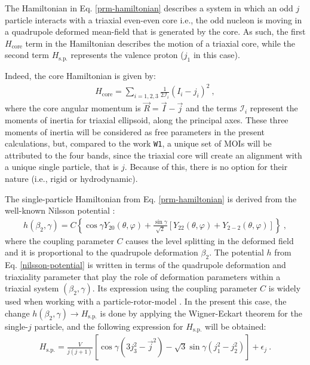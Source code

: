 \documentclass[11pt]{article}
\begin{document}
The Hamiltonian in Eq. \ref{prm-hamiltonian} describes a system in which an odd $j$ particle interacts with a triaxial even-even core i.e., the odd nucleon is moving in a quadrupole deformed mean-field that is generated by the core. As such, the first $H_\text{core}$ term in the Hamiltonian describes the motion of a triaxial core, while the second term $H_\text{s.p.}$ represents the  valence proton ($j_1$ in this case).

Indeed, the core Hamiltonian is given by:
\begin{align}
    H_\text{core}=\sum_{i=1,2,3}\frac{1}{2\mathcal{I}_i}(I_i-j_i)^2\ ,
    \label{core-hamiltonian}
\end{align}
where the core angular momentum is $\vec{R}=\vec{I}-\vec{j}$ and the terms $\mathcal{I}_i$ represent the moments of inertia for triaxial ellipsoid, along the principal axes. These three moments of inertia will be considered as free parameters in the present calculations, but, compared to the work \texttt{W1}, a unique set of MOIs will be attributed to the four bands, since the triaxial core will create an alignment with a unique single particle, that is $j$. Because of this, there is no option for their nature (i.e., rigid or hydrodynamic).

The single-particle Hamiltonian from Eq. \ref{prm-hamiltonian} is derived from the well-known Nilsson potential \cite{meyer1975collective,wang2008description}:
\begin{align}
    h(\beta_2,\gamma)=C\left\{\cos\gamma Y_{20}(\theta,\varphi)+\frac{\sin\gamma}{\sqrt{2}}\left[Y_{22}(\theta,\varphi)+Y_{2-2}(\theta,\varphi)\right]\right\}\ ,
    \label{nilsson-potential}
\end{align}
where the coupling parameter $C$ causes the level splitting in the deformed field and it is proportional to the quadrupole deformation $\beta_2$. The potential $h$ from Eq. \ref{nilsson-potential} is written in terms of the quadrupole deformation and triaxiality parameter that play the role of deformation parameters within a triaxial system $(\beta_2,\gamma)$. Its expression using the coupling parameter $C$ is widely used when working with a particle-rotor-model \cite{peng2003description,koike2004chiral,wang2007doublet}. In the present this case, the change $h(\beta_2,\gamma)\to H_\text{s.p.}$ is done by applying the Wigner-Eckart theorem for the single-$j$ particle, and the following expression for $H_\text{s.p.}$ will be obtained:
\begin{align}
    H_\text{s.p.}=\frac{V}{j(j+1)}\left[\cos\gamma(3j_3^2-\vec{j}^2)-\sqrt{3}\sin\gamma(j_1^2-j_2^2)\right]+\epsilon_j\ .
    \label{single-particle-hamiltonian}
\end{align}
\end{document}
